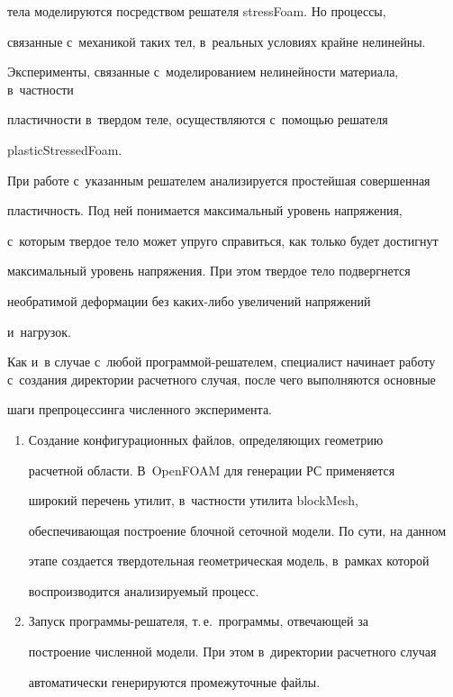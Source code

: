 тела моделируются посредством решателя \mbox{stressFoam}. Но процессы, 


связанные с~механикой таких тел, в~реальных условиях крайне нелинейны. 


Эксперименты, связанные с~моделированием нелинейности материала, в~част\-ности


 плас\-тич\-ности в~твер\-дом теле, осуществляются с~по\-мощью решателя 


\mbox{plasticStressedFoam}. 


   


   При работе с~указанным решателем анализируется прос\-тей\-шая совершенная 


плас\-тич\-ность. Под ней понимается максимальный уровень напряжения, 


с~которым твер\-дое тело может упру\-го справиться, как только будет достигнут 


максимальный уровень на\-пря\-же\-ния. При этом твердое тело подвергнется 


необратимой деформации без ка\-ких-ли\-бо увеличений на\-пря\-же\-ний 


и~нагрузок.


   


   Как и~в случае с~любой программой-решателем, специалист начинает работу с~создания директории расчетного случая, после чего выполняются основные 


шаги препроцессинга чис\-лен\-но\-го эксперимента.


   \begin{enumerate}[1.]


\item Создание конфигурационных файлов, определяющих гео\-мет\-рию 


расчетной области. В~\mbox{OpenFOAM} для генерации РС применяется 


широкий перечень утилит, в~част\-ности утилита \mbox{blockMesh}, 


обеспечивающая по\-стро\-ение блочной сеточной модели. По сути, на данном 


этапе создается твер\-до\-тель\-ная гео\-мет\-ри\-че\-ская модель, в~рамках которой 


воспроизводится анализируемый процесс.


\item Запуск про\-грам\-мы-ре\-ша\-те\-ля, т.\,е.\ программы, отвечающей за 


построение численной модели. При этом в~директории расчетного случая 


автоматически генерируются промежуточные файлы.


   \end{enumerate}


